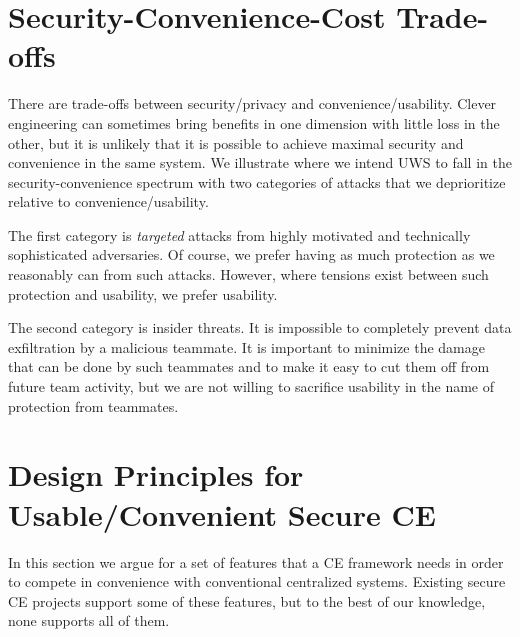\documentclass{article}
\begin{document}
\section{Security-Convenience-Cost Trade-offs}

There are trade-offs between security{\slash}privacy and convenience{\slash}usability.
Clever engineering can sometimes bring benefits in one dimension with little loss in the other, but it is unlikely that it is possible to achieve maximal security and convenience in the same system.
We illustrate where we intend UWS to fall in the security-convenience spectrum with two categories of attacks that we deprioritize relative to convenience/usability.

The first category is \emph{targeted} attacks from highly motivated and technically sophisticated adversaries.
Of course, we prefer having as much protection as we reasonably can from such attacks.
However, where tensions exist between such protection and usability, we prefer usability.

The second category is insider threats.
It is impossible to completely prevent data exfiltration by a malicious teammate.
It is important to minimize the damage that can be done by such teammates and to make it easy to cut them off from future team activity, but we are not willing to sacrifice usability in the name of protection from teammates.



\section{Design Principles for Usable/Convenient Secure CE}

In this section we argue for a set of features that a CE framework needs in order to compete in convenience with conventional centralized systems.
Existing secure CE projects support some of these features, but to the best of our knowledge, none supports all of them.
\end{document}
